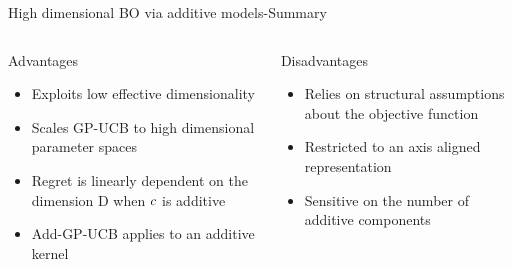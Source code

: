\begin{frame}{High dimensional BO via additive models-Summary}
\begin{columns}[T] %
\begin{column}{.48\textwidth}


    \begin{block}{Advantages}
    \begin{itemize}
    	\item Exploits low effective dimensionality
    	\item Scales GP-UCB to high dimensional parameter spaces
    	\item Regret is linearly dependent on the dimension D when $c$ is additive
    	\item Add-GP-UCB applies to an additive kernel
    \end{itemize}
    \end{block}
\pause
\end{column}%

\hfill%

\begin{column}{.48\textwidth}

    \begin{block}{Disadvantages}
    \begin{itemize}
    	\item Relies on structural assumptions about the objective function
    	\item Restricted to an axis aligned representation
    	\item Sensitive on the number of additive components
    \end{itemize}
\end{block}

\end{column}
\end{columns}   
\end{frame}

